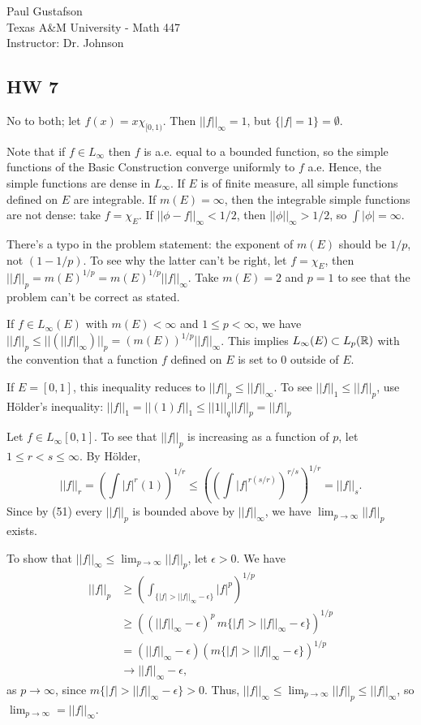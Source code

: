 \documentclass{article}
\begin{document}
\noindent Paul Gustafson\\
\noindent Texas A\&M University - Math 447\\ 
\noindent Instructor: Dr. Johnson

\subsection*{HW 7}
 No to both; let $f(x) = x \chi_{[0,1)}$. Then $||f||_\infty = 1$, but $\{|f| = 1\} = \emptyset$.

 Note that if $f \in L_\infty$ then $f$ is a.e. equal to a bounded function, so the simple functions of the Basic Construction converge uniformly to $f$ a.e. Hence, the simple functions are dense in $L_\infty$.  If $E$ is of finite measure, all simple functions defined on $E$ are integrable.  If $m(E) = \infty$, then the integrable simple functions are not dense: take $f = \chi_E$. If $||\phi - f||_\infty < 1/2$, then $||\phi||_\infty > 1/2$, so $\int |\phi| = \infty$.

 There's a typo in the problem statement: the exponent of $m(E)$ should be $1/p$, not $(1-1/p)$.  To see why the latter can't be right, let $f = \chi_E$, then $||f||_p = m(E)^{1/p} = m(E)^{1/p} ||f||_\infty$. Take $m(E) = 2$ and $p = 1$ to see that the problem can't be correct as stated.

If $f \in L_\infty(E)$ with $m(E) < \infty$ and $1 \le p < \infty$, we have
$||f||_p \le ||( ||f||_\infty) ||_p = (m(E))^{1/p} ||f||_\infty$. This implies $L_\infty(E) \subset L_p(\mathbb{R})$ with the convention that a function $f$ defined on $E$ is set to $0$ outside of $E$.  

If $E = [0,1]$, this inequality reduces to $||f||_p \le ||f||_\infty$. To see $||f||_1 \le ||f||_p$, use H\"{o}lder's inequality: $||f||_1 = ||(1)f||_1 \le ||1||_q ||f||_p = ||f||_p$

 Let $f \in L_\infty[0,1]$. To see that $||f||_p$ is increasing as a function of $p$,  let $1\le r < s \le \infty$. By H\"{o}lder,
$$||f||_r = (\int |f|^r (1))^{1/r} \le ((\int |f|^{r(s/r)})^{r/s})^{1/r} = ||f||_s.$$
Since by (51) every $||f||_p$ is bounded above by $||f||_\infty$, we have $\lim_{p\to\infty} ||f||_p$ exists.

To show that $||f||_\infty \le \lim_{p\to\infty} ||f||_p$, let $\epsilon > 0$. We have
\begin{align*}
||f||_p & \ge \left(\int_{\{|f| > ||f||_\infty - \epsilon\}} |f|^p \right)^{1/p}
\\ & \ge \left((||f||_\infty - \epsilon)^p \,m\{|f| > ||f||_\infty - \epsilon\}\right)^{1/p}
\\ & = (||f||_\infty - \epsilon) (m\{|f| > ||f||_\infty - \epsilon\})^{1/p}
\\ & \to ||f||_\infty - \epsilon,
\end{align*}
as $p \to \infty$, since $m \{ |f| > ||f||_\infty - \epsilon\} > 0$. Thus,
$||f||_\infty \le \lim_{p\to\infty} ||f||_p \le ||f||_\infty$, so $\lim_{p\to\infty} = ||f||_\infty$.
\end{document}
